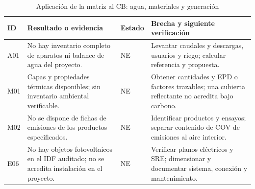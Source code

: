 \begin{table}[H]\centering\caption{Aplicación de la matriz al CB: agua, materiales y generación}
{\fontsize{10}{12.5}\selectfont\singlespacing\renewcommand{\arraystretch}{1.3}\setlength{\tabcolsep}{4pt}\begin{tabular}{>{\raggedright\arraybackslash}p{0.8cm}>{\raggedright\arraybackslash}p{5.5cm}>{\raggedright\arraybackslash}p{1.4cm}>{\raggedright\arraybackslash}p{6.2cm}}\toprule ID & Resultado o evidencia & Estado & Brecha y siguiente verificación \\ \midrule
A01 & No hay inventario completo de aparatos ni balance de agua del proyecto. & NE & Levantar caudales y descargas, usuarios y riego; calcular referencia y propuesta. \\[5pt]
M01 & Capas y propiedades térmicas disponibles; sin inventario ambiental verificable. & NE & Obtener cantidades y EPD o factores trazables; una cubierta reflectante no acredita bajo carbono. \\[5pt]
M02 & No se dispone de fichas de emisiones de los productos especificados. & NE & Identificar productos y ensayos; separar contenido de COV de emisiones al aire interior. \\[5pt]
E06 & No hay objetos fotovoltaicos en el IDF auditado; no se acredita instalación en el proyecto. & NE & Verificar planos eléctricos y SRE; dimensionar y documentar sistema, conexión y mantenimiento. \\[5pt]
\bottomrule\end{tabular}}\end{table}\par\medskip
